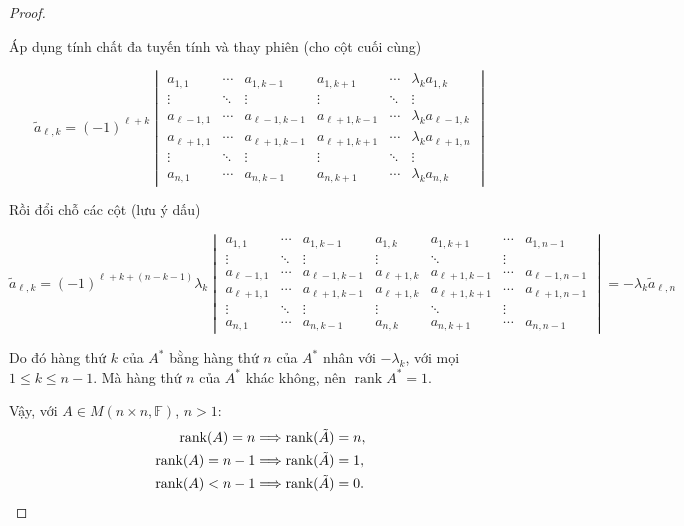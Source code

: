 \documentclass[class=nhvh-linear-algebra,crop=false]{standalone}
\begin{document}
\begin{proof}
\begin{enumerate}[label = \textbf{Trường hợp \arabic*.},itemindent=2cm]
              Áp dụng tính chất đa tuyến tính và thay phiên (cho cột cuối cùng)

              \[\tilde{a}_{\ell, k} = {(-1)}^{\ell + k} \begin{vmatrix} a_{1,1} & \cdots & a_{1,k-1} & a_{1,k+1} & \cdots & \lambda_{k}a_{1,k} \\ \vdots & \ddots & \vdots & \vdots & \ddots & \vdots \\ a_{\ell - 1,1} & \cdots & a_{\ell-1,k-1} & a_{\ell+1,k-1} & \cdots & \lambda_{k} a_{\ell-1,k} \\ a_{\ell+1,1} & \cdots & a_{\ell+1,k-1} & a_{\ell+1,k+1} & \cdots & \lambda_{k} a_{\ell+1,n} \\ \vdots & \ddots & \vdots & \vdots & \ddots & \vdots \\ a_{n,1} & \cdots & a_{n,k-1} & a_{n,k+1} & \cdots & \lambda_{k}a_{n,k} \end{vmatrix}\]

              Rồi đổi chỗ các cột (lưu ý dấu)

              \[\tilde{a}_{\ell, k} = {(-1)}^{\ell + k + (n - k - 1)}\lambda_{k} \begin{vmatrix} a_{1,1} & \cdots & a_{1,k-1} & a_{1,k} & a_{1,k+1} & \cdots & a_{1,n-1} \\ \vdots & \ddots & \vdots & \vdots & \ddots & \vdots \\ a_{\ell - 1,1} & \cdots & a_{\ell-1,k-1} & a_{\ell+1,k} & a_{\ell+1,k-1} & \cdots & a_{\ell-1,n-1} \\ a_{\ell+1,1} & \cdots & a_{\ell+1,k-1} & a_{\ell+1,k} & a_{\ell+1,k+1} & \cdots & a_{\ell+1,n-1} \\ \vdots & \ddots & \vdots & \vdots & \ddots & \vdots \\ a_{n,1} & \cdots & a_{n,k-1} & a_{n,k} & a_{n,k+1} & \cdots & a_{n,n-1} \end{vmatrix} = -\lambda_{k} \tilde{a}_{\ell,n} \]


              Do đó hàng thứ $k$ của $A^{*}$ bằng hàng thứ $n$ của $A^{*}$ nhân với $-\lambda_{k}$, với mọi $1\leq k\leq n-1$. Mà hàng thứ $n$ của $A^{*}$ khác không, nên $\operatorname{rank} A^{*} = 1$.
    \end{enumerate}

    \par Vậy, với $A\in M(n\times n,\mathbb{F})$, $n > 1$:
    \begin{align*}
        \text{rank}(A) = n   & \Longrightarrow \text{rank}(\tilde{A}) = n, \\
        \text{rank}(A) = n-1 & \Longrightarrow \text{rank}(\tilde{A}) = 1, \\
        \text{rank}(A) < n-1 & \Longrightarrow \text{rank}(\tilde{A}) = 0.
    \end{align*}
\end{proof}
\end{document}
